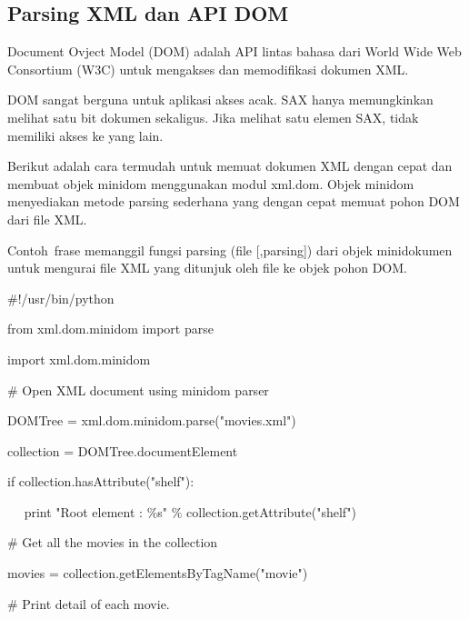 \documentclass{wileySix}
\begin{document}
\begin{myEnumerate}
\begin{myEnumerate}
{\section{Parsing XML dan API DOM}
\par
\noindent 
\hspace*{0.5in} Document Ovject Model (DOM) adalah API lintas bahasa dari World Wide Web Consortium (W3C) untuk mengakses dan memodifikasi dokumen XML. \par
\noindent 
\hspace*{0.5in} DOM sangat berguna untuk aplikasi akses acak. SAX hanya memungkinkan melihat satu bit dokumen sekaligus. Jika melihat satu elemen SAX, tidak memiliki akses ke yang lain. \par
\noindent 
\hspace*{0.5in} Berikut adalah cara termudah untuk memuat dokumen XML dengan cepat dan membuat objek minidom menggunakan modul xml.dom. Objek minidom menyediakan metode parsing sederhana yang dengan cepat memuat pohon DOM dari file XML. \par
\noindent 
\hspace*{0.5in} Contoh~frase memanggil fungsi  parsing (file [,parsing]) dari objek minidokumen untuk mengurai file XML yang ditunjuk oleh file ke objek pohon DOM. \par
\noindent 
$  \#  $!/usr/bin/python \par
\vspace{12pt}
\noindent 
from xml.dom.minidom import parse \par
\noindent 
import xml.dom.minidom \par
\vspace{12pt}
\noindent 
$  \#  $ Open XML document using minidom parser \par
\noindent 
DOMTree = xml.dom.minidom.parse("movies.xml") \par
\noindent 
collection = DOMTree.documentElement \par
\noindent 
if collection.hasAttribute("shelf"): \par
\noindent 
~~ print "Root element :  $  \%  $s"  $  \%  $ collection.getAttribute("shelf") \par
\vspace{12pt}
\noindent 
$  \#  $ Get all the movies in the collection \par
\noindent 
movies = collection.getElementsByTagName("movie") \par
\vspace{12pt}
\noindent 
$  \#  $ Print detail of each movie. \par
}
\end{myEnumerate}
\end{myEnumerate}
\end{document}
